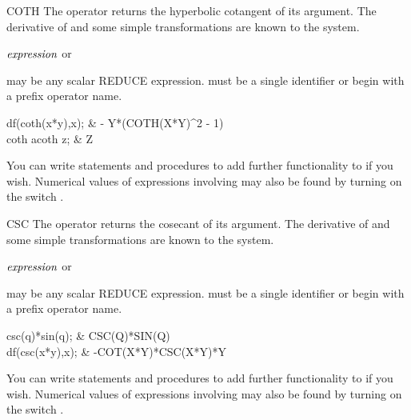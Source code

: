 \begin{Operator}{COTH}
The  operator returns the hyperbolic cotangent of its argument.
The derivative of  and some simple transformations are known
to the system.

\begin{Syntax}
\(\meta{expression}\) or  
\end{Syntax}

 may be any scalar REDUCE expression.  
must be a single identifier or begin with a prefix operator name.

\begin{Examples}
df(coth(x*y),x);             &      - Y*(COTH(X*Y)^{2}  - 1) \\

coth acoth z;                &      Z
\end{Examples}

\begin{Comments}
You can write  statements and procedures to add further
functionality to  if you wish.  Numerical values of expressions
involving  may also be found by turning on the switch
.

\end{Comments}
\end{Operator}

\begin{Operator}{CSC}
The  operator returns the cosecant of its argument.
The derivative of  and some simple transformations are known
to the system.

\begin{Syntax}
\(\meta{expression}\) or  
\end{Syntax}

 may be any scalar REDUCE expression.  
must be a single identifier or begin with a prefix operator name.

\begin{Examples}

csc(q)*sin(q);               &       CSC(Q)*SIN(Q) \\

df(csc(x*y),x);              &       -COT(X*Y)*CSC(X*Y)*Y
\end{Examples}

\begin{Comments}
You can write  statements and procedures to add further
functionality to  if you wish.  Numerical values of expressions
involving  may also be found by turning on the switch
.

\end{Comments}
\end{Operator}


